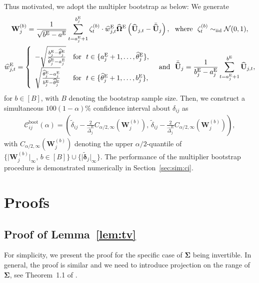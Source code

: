 \documentclass[11pt, a4paper]{article}
\newcommand{\mbf}{\mathbf}
\newcommand{\mc}{\mathcal}
\renewcommand{\l}{\left}
\renewcommand{\r}{\right}
\def\wh{\widehat}
\def\wc{\widetilde}
\newcommand{\cp}{\theta}
\newcommand{\iid}{\text{\upshape iid}}
\newcommand{\tE}{\text{E}}
\theoremstyle{definition}
\theoremstyle{definition}
\theoremstyle{definition}
\theoremstyle{definition}
\theoremstyle{definition}
\theoremstyle{remark}
\theoremstyle{definition}
\theoremstyle{definition}
\theoremstyle{definition}
\begin{document}
Thus motivated, we adopt the multipler bootstrap as below: We generate
\begin{multline*}
\mbf W^{(b)}_j = \frac{1}{\sqrt{b^{\tE} - a^{\tE}}} \sum_{t = a^{\tE}_j + 1}^{b^{\tE}_j} \zeta^{(b)}_t \cdot \wh{w}^{\tE}_{j, t} \wh{\bm\Omega}^{\tE} \l( \wh{\mbf U}_{j, t} - \bar{\wh{\mbf U}}_j \r), \text{ \ where \ } \zeta^{(b)}_t \sim_{\iid} \mc N(0, 1),
\\
\wh{w}_{j, t}^{\tE} = \l\{ \begin{array}{ll}
- \sqrt{\frac{b^{\tE}_j - \wh\cp^{\tE}_j}{\wh\cp^{\tE}_j - a^{\tE}_j}} & \text{for \ } t \in \{a^{\tE}_j + 1, \ldots, \wh\cp^{\tE}_j \},  \\
\sqrt{\frac{\wh\cp^{\tE}_j - a^{\tE}_j}{b^{\tE}_j - \wh\cp^{\tE}_j}} & \text{for \ } t \in \{\wh\cp^{\tE}_j + 1, \ldots, b^{\tE}_j \}, 
\end{array}\r.
\text{ \ and \ }
\bar{\wh{\mbf U}}_j = \frac{1}{b^{\tE}_j - a^{\tE}_j} \sum_{t = a^{\tE}_j + 1}^{b^{\tE}} \wh{\mbf U}_{j, t},
\end{multline*}
for $b \in [B]$, with $B$ denoting the bootstrap sample size.
Then, we construct a simultaneous $100(1 - \alpha)\%$ confidence interval about $\delta_{ij}$ as
\begin{align*}
\mc C^{\text{boot}}_{ij}(\alpha) = \l( \wc{\delta}_{ij} - \frac{2}{\wh\Delta^{\tE}_j} C_{\alpha/2, \infty}(\mbf W^{(b)}_j), \, \wc{\delta}_{ij} - \frac{2}{\wh\Delta^{\tE}_j} C_{\alpha/2, \infty}(\mbf W^{(b)}_j) \r),
\end{align*}
with $C_{\alpha/2, \infty}(\mbf W^{(b)}_j)$ denoting the upper $\alpha/2$-quantile of $\{\vert \mbf W^{(b)}_j \vert_\infty, \, b \in [B]\} \cup \{\vert \wc{\bm\delta}_j \vert_\infty\}$.
The performance of the multiplier bootstrap procedure is demonstrated numerically in Section~\ref{sec:sim:ci}.

\section{Proofs}

\subsection{Proof of Lemma~\ref{lem:tv}}
For simplicity, we present the proof for the specific case of $\bm\Sigma$ being invertible. In general, the proof is similar and we need to introduce projection on the range of $\bm\Sigma$, see Theorem~1.1 of \citet{devroye2018total}. 
\end{document}
